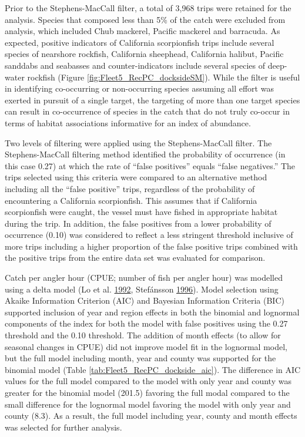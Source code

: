 \documentclass[12pt,]{article}
\begin{document}
Prior to the Stephens-MacCall filter, a total of 3,968 trips were
retained for the analysis. Species that composed less than 5\% of the
catch were excluded from analysis, which included Chub mackerel, Pacific
mackerel and barracuda. As expected, positive indicators of California
scorpionfish trips include several species of nearshore rockfish,
California sheephead, California halibut, Pacific sanddabs and seabasses
and counter-indicators include several species of deep-water rockfish
(Figure \ref{fig:Fleet5_RecPC_docksideSM}). While the filter is useful
in identifying co-occurring or non-occurring species assuming all effort
was exerted in pursuit of a single target, the targeting of more than
one target species can result in co-occurrence of species in the catch
that do not truly co-occur in terms of habitat associations informative
for an index of abundance.

Two levels of filtering were applied using the Stephens-MacCall filter.
The Stephens-MacCall filtering method identified the probability of
occurrence (in this case 0.27) at which the rate of ``false positives''
equals ``false negatives.'' The trips selected using this criteria were
compared to an alternative method including all the ``false positive''
trips, regardless of the probability of encountering a California
scorpionfish. This assumes that if California scorpionfish were caught,
the vessel must have fished in appropriate habitat during the trip. In
addition, the false positives from a lower probability of occurrence
(0.10) was considered to reflect a less stringent threshold inclusive of
more trips including a higher proportion of the false positive trips
combined with the positive trips from the entire data set was evaluated
for comparison.

Catch per angler hour (CPUE; number of fish per angler hour) was
modelled using a delta model (Lo et al.
\protect\hyperlink{ref-Lo1992}{1992}, Stefánsson
\protect\hyperlink{ref-Stefansson1996}{1996}). Model selection using
Akaike Information Criterion (AIC) and Bayesian Information Criteria
(BIC) supported inclusion of year and region effects in both the
binomial and lognormal components of the index for both the model with
false positives using the 0.27 threshold and the 0.10 threshold. The
addition of month effects (to allow for seasonal changes in CPUE) did
not improve model fit in the lognormal model, but the full model
including month, year and county was supported for the binomial model
(Table \ref{tab:Fleet5_RecPC_dockside_aic}). The difference in AIC
values for the full model compared to the model with only year and
county was greater for the binomial model (201.5) favoring the full
modal compared to the small difference for the lognormal model favoring
the model with only year and county (8.3). As a result, the full model
including year, county and month effects was selected for further
analysis.
\end{document}
